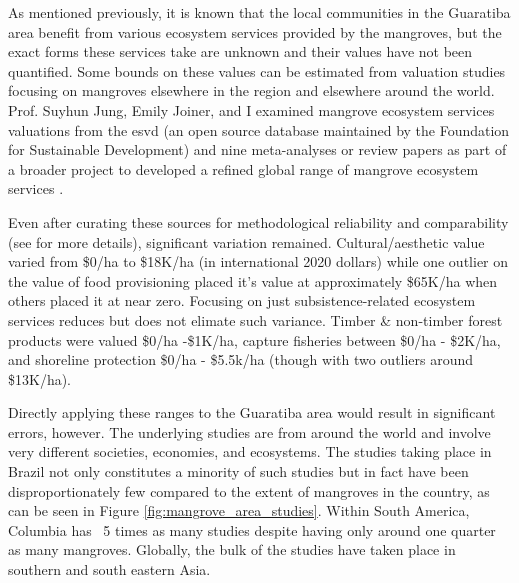 As mentioned previously, it is known that the local communities in the Guaratiba area benefit from various ecosystem services provided by the mangroves, but the exact forms these services take are unknown and their values have not been quantified. Some bounds on these values can be estimated from valuation studies focusing on mangroves elsewhere in the region and elsewhere around the world. Prof. Suyhun Jung, Emily Joiner, and I examined mangrove ecosystem services valuations from the \ac{esvd} \cite{grootEcosystemServicesValuation2020} (an open source database maintained by the Foundation for Sustainable Development) and nine meta-analyses or review papers \cite{branderEmpiricsWetlandValuation2006,branderEcosystemServiceValues2012, salemEconomicValueMangroves2012, veghMangroveEcosystemServices2014, voReviewValuationMethods2012, himes-cornellMangroveEcosystemService2018, getznerEcosystemServicesMangrove2020, barbierProtectiveServiceMangrove2016, barbierEstuarineCoastalEcosystems2020} as part of a broader project to developed a refined global range of mangrove ecosystem services \cite{jungGapsMangroveForestInReview}.

Even after curating these sources for methodological reliability and comparability (see \cite{jungGapsMangroveForestInReview} for more details), significant variation remained. Cultural/aesthetic value varied from \$0/ha to \$18K/ha (in international 2020 dollars) while one outlier on the value of food provisioning placed it's value at approximately \$65K/ha when others placed it at near zero. Focusing on just subsistence-related ecosystem services reduces but does not elimate such variance. Timber \& non-timber forest products were valued \$0/ha -\$1K/ha, capture fisheries between \$0/ha - \$2K/ha, and shoreline protection \$0/ha - \$5.5k/ha (though with two outliers around \$13K/ha).

Directly applying these ranges to the Guaratiba area would result in significant errors, however. The underlying studies are from around the world and involve very different societies, economies, and ecosystems. The studies taking place in Brazil not only constitutes a minority of such studies but in fact have been disproportionately few compared to the extent of mangroves in the country, as can be seen in Figure \ref{fig:mangrove_area_studies}. Within South America, Columbia has ~5 times as many studies despite having only around one quarter as many mangroves. Globally, the bulk of the studies have taken place in southern and south eastern Asia. 

